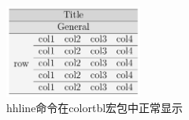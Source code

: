 \begin{figure}[!h]
    \centering
    \includegraphics[width=0.4\textwidth]{figure/chap-tab/cline-colortbl-sol.png}
    \caption{{hhline}命令在{colortbl}宏包中正常显示}
    \label{fig:cline-colortbl-sol}
\end{figure}